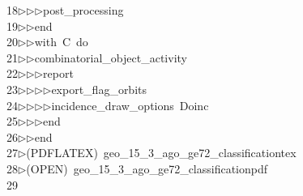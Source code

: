 \begin{tabbing}
18\>$\triangleright$\>$\triangleright$\>$\triangleright$\>post\_processing\ \\[0pt]
19\>$\triangleright$\>$\triangleright$\>end\ \\[0pt]
20\>$\triangleright$\>$\triangleright$\>with\ C\ do\ \\[0pt]
21\>$\triangleright$\>$\triangleright$\>combinatorial\_object\_activity\ \\[0pt]
22\>$\triangleright$\>$\triangleright$\>$\triangleright$\>report\ \\[0pt]
23\>$\triangleright$\>$\triangleright$\>$\triangleright$\>$\triangleright$\>export\_flag\_orbits\ \\[0pt]
24\>$\triangleright$\>$\triangleright$\>$\triangleright$\>$\triangleright$\>incidence\_draw\_options\ Doinc\ \\[0pt]
25\>$\triangleright$\>$\triangleright$\>$\triangleright$\>end\ \\[0pt]
26\>$\triangleright$\>$\triangleright$\>end\\[0pt]
27\>$\triangleright$\>(PDFLATEX)\ geo\_15\_3\_ago\_ge72\_classificationtex\\[0pt]
28\>$\triangleright$\>(OPEN)\ geo\_15\_3\_ago\_ge72\_classificationpdf\\[0pt]
29\>\end{tabbing}
